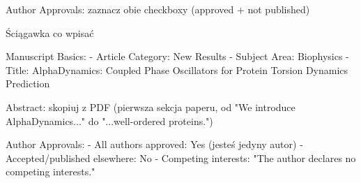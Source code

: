   Author Approvals: zaznacz obie checkboxy (approved + not published)




Ściągawka co wpisać

  Manuscript Basics:
  - Article Category: New Results
  - Subject Area: Biophysics
  - Title: AlphaDynamics: Coupled Phase Oscillators for Protein Torsion Dynamics Prediction

  Abstract: skopiuj z PDF (pierwsza sekcja paperu, od "We introduce AlphaDynamics..." do "...well-ordered proteins.")

  Author Approvals:
  - All authors approved: Yes (jesteś jedyny autor)
  - Accepted/published elsewhere: No
  - Competing interests: "The author declares no competing interests."






